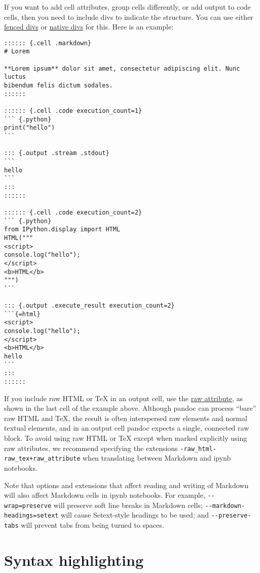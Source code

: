 \documentclass[
  a4paper,
]{article}
\begin{document}
If you want to add cell attributes, group cells differently, or add
output to code cells, then you need to include divs to indicate the
structure. You can use either
\protect\hyperlink{extension-fenced_divs}{fenced divs} or
\protect\hyperlink{extension-native_divs}{native divs} for this. Here is
an example:

\begin{verbatim}
:::::: {.cell .markdown}
# Lorem

**Lorem ipsum** dolor sit amet, consectetur adipiscing elit. Nunc luctus
bibendum felis dictum sodales.
::::::

:::::: {.cell .code execution_count=1}
``` {.python}
print("hello")
```

::: {.output .stream .stdout}
```
hello
```
:::
::::::

:::::: {.cell .code execution_count=2}
``` {.python}
from IPython.display import HTML
HTML("""
<script>
console.log("hello");
</script>
<b>HTML</b>
""")
```

::: {.output .execute_result execution_count=2}
```{=html}
<script>
console.log("hello");
</script>
<b>HTML</b>
hello
```
:::
::::::
\end{verbatim}

If you include raw HTML or TeX in an output cell, use the
\protect\hyperlink{extension-raw_attribute}{raw attribute}, as shown in
the last cell of the example above. Although pandoc can process ``bare''
raw HTML and TeX, the result is often interspersed raw elements and
normal textual elements, and in an output cell pandoc expects a single,
connected raw block. To avoid using raw HTML or TeX except when marked
explicitly using raw attributes, we recommend specifying the extensions
\texttt{-raw\_html-raw\_tex+raw\_attribute} when translating between
Markdown and ipynb notebooks.

Note that options and extensions that affect reading and writing of
Markdown will also affect Markdown cells in ipynb notebooks. For
example, \texttt{-\/-wrap=preserve} will preserve soft line breaks in
Markdown cells; \texttt{-\/-markdown-headings=setext} will cause
Setext-style headings to be used; and \texttt{-\/-preserve-tabs} will
prevent tabs from being turned to spaces.

\hypertarget{syntax-highlighting}{%
\section{Syntax highlighting}\label{syntax-highlighting}}
\end{document}
